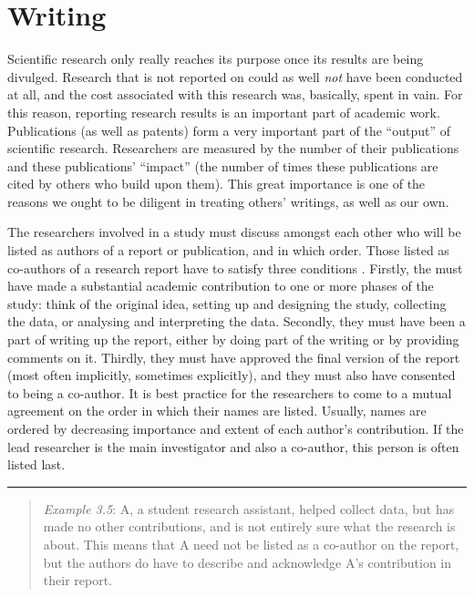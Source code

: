 \documentclass[
]{book}
\begin{document}
\section{Writing}\label{writing}

Scientific research only really reaches its purpose once its results are being divulged. Research that is not reported on could as well \emph{not} have been conducted at all, and the cost associated with this research was, basically, spent in vain. For this reason, reporting research results is an important part of academic work. Publications (as well as patents) form a very important part of the ``output'' of scientific research. Researchers are measured by the number of their publications and these publications' ``impact'' (the number of times these publications are cited by others who build upon them). This great importance is one of the reasons we ought to be diligent in treating others' writings, as well as our own.

The researchers involved in a study must discuss amongst each other who will be listed as authors of a report or publication, and in which order. Those listed as co-authors of a research report have to satisfy three conditions \citep[Ch.10]{ORI12}. Firstly, the must have made a substantial academic contribution to one or more phases of the study: think of the original idea, setting up and designing the study, collecting the data, or analysing and interpreting the data. Secondly, they must have been a part of writing up the report, either by doing part of the writing or by providing comments on it. Thirdly, they must have approved the final version of the report (most often implicitly, sometimes explicitly), and they must also have consented to being a co-author. It is best practice for the researchers to come to a mutual agreement on the order in which their names are listed. Usually, names are ordered by decreasing importance and extent of each author's contribution. If the lead researcher is the main investigator and also a co-author, this person is often listed last.

\begin{center}\rule{0.5\linewidth}{0.5pt}\end{center}

\begin{quote}
\emph{Example 3.5}: A, a student research assistant, helped collect data, but has made no other contributions, and is not entirely sure what the research is about. This means that A need not be listed as a co-author on the report, but the authors do have to describe and acknowledge A's contribution in their report.
\end{quote}
\end{document}
